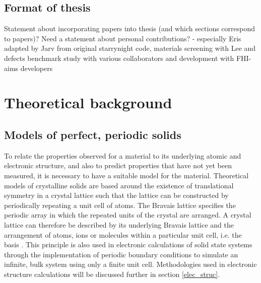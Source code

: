 \documentclass[11pt, twoside]{report}
\begin{document}
\section{Format of thesis}
Statement about incorporating papers into thesis (and which sections correspond to papers)? Need a statement about personal contributions? - especially Eris adapted by Jarv from original starrynight code, materials screening with Lee and defects benchmark study with various collaborators and development with FHI-aims developers

\chapter{Theoretical background} 

\section{Models of perfect, periodic solids}\label{crystal_models}
To relate the properties observed for a material to its underlying atomic and electronic structure, and also to predict properties that have not yet been measured, it is necessary to have a suitable model for the material. Theoretical models of crystalline solids are based around the existence of translational symmetry in a crystal lattice such that the lattice can be constructed by periodically repeating a unit cell of atoms. The Bravais lattice specifies the periodic array in which the repeated units of the crystal are arranged. A crystal lattice can therefore be described by its underlying Bravais lattice and the arrangement of atoms, ions or molecules within a particular unit cell, i.e. the basis \cite{AshcroftMermin2}. This principle is also used in electronic calculations of solid state systems through the implementation of periodic boundary conditions to simulate an infinite, bulk system using only a finite unit cell. Methodologies used in electronic structure calculations will be discussed further in section \ref{elec_struc}.
 
\end{document}
